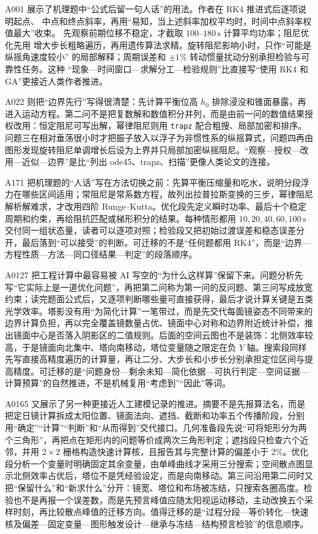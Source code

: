 A001 展示了机理题中“公式后留一句人话”的用法。作者在 RK4 推进式后逐项说明起点、
中点和终点斜率，再用“易知，当上述斜率加权平均时，时间中点斜率权值最大”收束。
先观察前期位移不稳定，才截取 $100$--$180\,\mathrm{s}$ 计算平均功率；阻尼优化先用
增大步长粗略遍历，再用遗传算法求精。旋转阻尼影响小时，只作“可能是纵摇角速度较小”
的局部解释；周期误差和 $\pm1\%$ 转动惯量扰动分别承担检验与可靠性任务。这种
“现象—时间窗口—求解分工—检验规则”比直接写“使用 RK4 和 GA”更接近人类作者推进。

A022 则把“边界先行”写得很清楚：先计算平衡位高 $h_0$ 排除浸没和锥面暴露，再进入运动方程。第二问不是把复数解和数值积分并列，而是由前一问的数值结果授权改用：恒定阻尼可写出解，幂律阻尼则用 \texttt{trapz} 配合粗搜、局部加密和排序。问题三在相对垂荡很小时才把振子放入以浮子为非惯性系的纵摇算式，问题四再由图形发现旋转阻尼单调增长后设为上界并只局部加密纵摇阻尼。“观察—授权—改用—近似—边界”是比“列出 ode45、trapz、扫描”更像人类论文的连接。

A171 把机理题的“人话”写在方法切换之前：先算平衡压缩量和吃水，说明分段浮力在哪些区间适用；常阻尼是常系数方程，故列出拉普拉斯变换的三步，幂律阻尼解析解难求，才改用四阶 Runge--Kutta。优化段先定义瞬时功率、最后十个稳定周期和约束，再给阻抗匹配或梯形积分的结果。每种情形都用 $10,20,40,60,100\,\mathrm{s}$ 交付同一组状态量，读者可以逐项对照；检验段又把初始过渡误差和稳态误差分开，最后落到“可以接受”的判断。可迁移的不是“任何题都用 RK4”，而是“边界—方程性质—方法—同口径结果—判定”的段落顺序。

A0127 把工程计算中最容易被 AI 写空的“为什么这样算”保留下来。问题分析先写“它实际上是一道优化问题”，再把第二问称为第一问的反问题、第三问写成放宽约束；读完题面公式后，又逐项判断哪些量可直接获得，最后才说计算关键是五类光学效率。塔影没有用“为简化计算”一笔带过，而是先交代每面镜姿态不同带来的边界计算负担，再以完全覆盖镜数量占优、镜面中心对称和边界附近统计补偿，推出镜面中心是否落入阴影区的二值规则。后面的空间云图也不是装饰：北侧效率较高，于是镜面向北集中、塔向南移动，塔位变量随之限定在负 $Y$ 轴。搜索段同样先写直接高精度遍历的计算量，再让二分、大步长和小步长分别承担定位区间与提高精度。可迁移的是“问题身份—剩余未知—简化依据—可执行判定—空间证据—计算预算”的自然推进，不是机械复用“考虑到”“因此”等词。

A0165 又展示了另一种更接近人工建模记录的推进。摘要不是先报算法名，而是把定日镜计算拆成太阳位置、镜面法向、遮挡、截断和功率五个传播阶段，分别用“确定”“计算”“判断”和“从而得到”交代接口。几何准备段先说“可将矩形分为两个三角形”，再把点在矩形内的问题等价成两次三角形判定；遮挡段只检查六个近邻，并用 $2\times2$ 栅格构造快速计算核，且报告其与完整计算的偏差小于 $2\%$。优化段分析一个变量时明确固定其余变量，由单峰曲线才采用三分搜索；空间散点图显示北侧效率占优后，塔位不是凭经验设定，而是向南移动。第三问沿用第二问时又把“保留什么”和“新求什么”分开：镜宽、塔位和布场被冻结，只搜索各圈高度。检验也不是再报一个误差数，而是先预言峰值应随太阳视运动移动，主动改换五个采样时刻，再比较散点峰值的迁移方向。值得迁移的是“过程分段—等价转化—快速核及偏差—固定变量—图形触发设计—继承与冻结—结构预言检验”的信息顺序。

